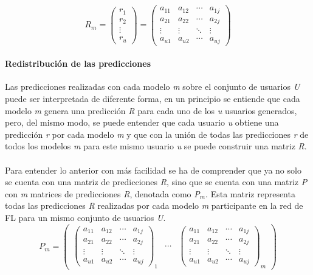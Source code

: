 \[  \textit{R$_{m}$} = 
    \begin{pmatrix}
        \textit{r$_{1}$}  \\ 
        \textit{r$_{2}$}  \\ 
        \vdots  \\ 
        \textit{r$_{u}$}
    \end{pmatrix} 
    =
    \begin{pmatrix}
        a_{11}  &  a_{12}  &  \cdots   & a_{1j} \\ 
        a_{21}  &  a_{22}  &  \cdots   & a_{2j}\\ 
        \vdots  &  \vdots  &  \ddots & \vdots  \\ 
        a_{u1}  &  a_{u2}  &  \cdots   & a_{uj}
    \end{pmatrix}
\]
\newpage
\paragraph{Redistribución de las predicciones}
Las predicciones realizadas con cada modelo \textit{m} sobre el conjunto de usuarios \textit{U} puede ser interpretada de diferente forma, en un principio se entiende que cada modelo \textit{m} genera una predicción \textit{R} para cada uno de los \textit{u} usuarios generados, pero, del mismo modo, se puede entender que cada usuario \textit{u} obtiene una predicción \textit{r} por cada modelo \textit{m} y que con la unión de todas las predicciones \textit{r} de todos los modelos \textit{m} para este mismo usuario \textit{u} se puede construir una matriz \textit{R}. 
\\ \\
Para entender lo anterior con más facilidad se ha de comprender que ya no solo se cuenta con una matriz de predicciones \textit{R}, sino que se cuenta con una matriz \textit{P} con \textit{m} matrices de predicciones \textit{R}, denotada como \textit{P$_{m}$}. Esta matriz representa todas las predicciones \textit{R} realizadas por cada modelo \textit{m} participante en la red de FL para un mismo conjunto de usuarios \textit{U}.
\[
    \textit{P$_{m}$}=
    \begin{pmatrix}
        \begin{pmatrix}
            a_{11}  &  a_{12}  &  \cdots   & a_{1j} \\ 
            a_{21}  &  a_{22}  &  \cdots   & a_{2j}\\ 
            \vdots  &  \vdots  &  \ddots & \vdots  \\ 
            a_{u1}  &  a_{u2}  &  \cdots   & a_{uj}
        \end{pmatrix}_{\textit{1}}
        & 
        \cdots 
        &
        \begin{pmatrix}
            a_{11}  &  a_{12}  &  \cdots   & a_{1j} \\ 
            a_{21}  &  a_{22}  &  \cdots   & a_{2j}\\ 
            \vdots  &  \vdots  &  \ddots & \vdots  \\ 
            a_{u1}  &  a_{u2}  &  \cdots   & a_{uj}
        \end{pmatrix}_{\textit{m}}
    \end{pmatrix}
\]
